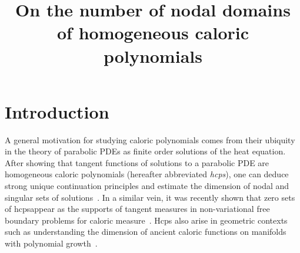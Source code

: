 \documentclass[AHL,Unicode,longabstracts,published]{cedram}
\title[Nodal domains of homogeneous caloric polynomials]{On the number of nodal domains of homogeneous caloric polynomials}
\author[\initial{M.} \lastname{Badger}]{\firstname{Matthew} \lastname{Badger}}
\author[\initial{C.} \lastname{Jeznach}]{\firstname{Cole} \lastname{Jeznach}}
\begin{document}
\maketitle

\section{Introduction}\label{s:intro}

A general motivation for studying caloric polynomials comes from their ubiquity in the theory of parabolic PDEs as finite order solutions of the heat equation. After showing that tangent functions of solutions to a parabolic PDE are homogeneous caloric polynomials (hereafter abbreviated \emph{hcps}), one can deduce strong unique continuation principles and estimate the dimension of nodal and singular sets of solutions~\cite{Chen98}. In a similar vein, it was recently shown that zero sets of hcps\linebreak appear as the supports of tangent measures in non-variational free boundary problems for caloric measure~\cite{MP21}. Hcps also arise in geometric contexts such as understanding the dimension of ancient caloric functions on manifolds with polynomial growth~\cite{CM21}.
\end{document}
